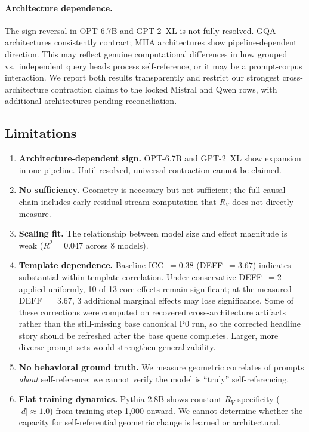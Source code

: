 \documentclass{article}
\newcommand{\RV}{R_V}
\newcommand{\dcohen}{d}
\begin{document}
\paragraph{Architecture dependence.}
The sign reversal in OPT-6.7B and GPT-2~XL is not fully resolved.
GQA architectures consistently contract; MHA architectures show pipeline-dependent direction.
This may reflect genuine computational differences in how grouped vs.\ independent query heads
process self-reference, or it may be a prompt-corpus interaction.
We report both results transparently and restrict our strongest cross-architecture contraction
claims to the locked Mistral and Qwen rows, with additional architectures pending reconciliation.

\subsection{Limitations}

\begin{enumerate}
\item \textbf{Architecture-dependent sign.}
      OPT-6.7B and GPT-2~XL show expansion in one pipeline. Until resolved, universal
      contraction cannot be claimed.
\item \textbf{No sufficiency.}
      Geometry is necessary but not sufficient; the full causal chain includes
      early residual-stream computation that $\RV$ does not directly measure.
\item \textbf{Scaling fit.}
      The relationship between model size and effect magnitude is weak
      ($R^2 = 0.047$ across 8 models).
\item \textbf{Template dependence.}
      Baseline ICC~$= 0.38$ (DEFF~$= 3.67$) indicates substantial within-template
      correlation.
      Under conservative DEFF~$= 2$ applied uniformly, 10 of 13 core effects remain
      significant; at the measured DEFF~$= 3.67$, 3 additional marginal effects
      may lose significance.
      Some of these corrections were computed on recovered cross-architecture artifacts rather than
      the still-missing base canonical P0 run, so the corrected headline story should be refreshed
      after the base queue completes.
      Larger, more diverse prompt sets would strengthen generalizability.
\item \textbf{No behavioral ground truth.}
      We measure geometric correlates of prompts \emph{about} self-reference;
      we cannot verify the model is ``truly'' self-referencing.
\item \textbf{Flat training dynamics.}
      Pythia-2.8B shows constant $\RV$ specificity ($|\dcohen| \approx 1.0$) from training
      step 1{,}000 onward.
      We cannot determine whether the capacity for self-referential geometric change is
      learned or architectural.
\end{enumerate}
\end{document}
